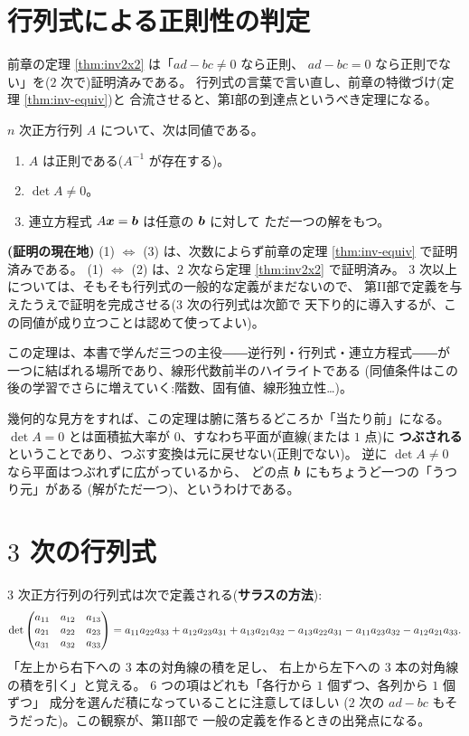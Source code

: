 \section{行列式による正則性の判定}

前章の定理 \ref{thm:inv2x2} は「$ad - bc \neq 0$ なら正則、
$ad - bc = 0$ なら正則でない」を($2$ 次で)証明済みである。
行列式の言葉で言い直し、前章の特徴づけ(定理 \ref{thm:inv-equiv})と
合流させると、第I部の到達点というべき定理になる。

\begin{teiri}[正則性の判定]\label{thm:det-regular}
$n$ 次正方行列 $A$ について、次は同値である。
\begin{enumerate}
\item $A$ は正則である($A^{-1}$ が存在する)。
\item $\det A \neq 0$。
\item 連立方程式 $A\bm{x} = \bm{b}$ は任意の $\bm{b}$ に対して
ただ一つの解をもつ。
\end{enumerate}
\end{teiri}

\noindent\textbf{(証明の現在地)}\quad
(1) $\iff$ (3) は、次数によらず前章の定理 \ref{thm:inv-equiv} で証明済みである。
(1) $\iff$ (2) は、$2$ 次なら定理 \ref{thm:inv2x2} で証明済み。
$3$ 次以上については、そもそも行列式の一般的な定義がまだないので、
第II部で定義を与えたうえで証明を完成させる($3$ 次の行列式は次節で
天下り的に導入するが、この同値が成り立つことは認めて使ってよい)。

この定理は、本書で学んだ三つの主役――逆行列・行列式・連立方程式――が
一つに結ばれる場所であり、線形代数前半のハイライトである
(同値条件はこの後の学習でさらに増えていく:階数、固有値、線形独立性…)。

幾何的な見方をすれば、この定理は腑に落ちるどころか「当たり前」になる。
$\det A = 0$ とは面積拡大率が $0$、すなわち平面が直線(または $1$ 点)に
\textbf{つぶされる}ということであり、つぶす変換は元に戻せない(正則でない)。
逆に $\det A \neq 0$ なら平面はつぶれずに広がっているから、
どの点 $\bm{b}$ にもちょうど一つの「うつり元」がある
(解がただ一つ)、というわけである。

\section{$3$ 次の行列式}

$3$ 次正方行列の行列式は次で定義される(\textbf{サラスの方法}):
\[
\det \begin{pmatrix}a_{11} & a_{12} & a_{13} \\ a_{21} & a_{22} & a_{23} \\ a_{31} & a_{32} & a_{33}\end{pmatrix}
= a_{11}a_{22}a_{33} + a_{12}a_{23}a_{31} + a_{13}a_{21}a_{32}
- a_{13}a_{22}a_{31} - a_{11}a_{23}a_{32} - a_{12}a_{21}a_{33}.
\]
「左上から右下への $3$ 本の対角線の積を足し、
右上から左下への $3$ 本の対角線の積を引く」と覚える。
$6$ つの項はどれも「各行から $1$ 個ずつ、各列から $1$ 個ずつ」
成分を選んだ積になっていることに注意してほしい
($2$ 次の $ad - bc$ もそうだった)。この観察が、第II部で
一般の定義を作るときの出発点になる。


